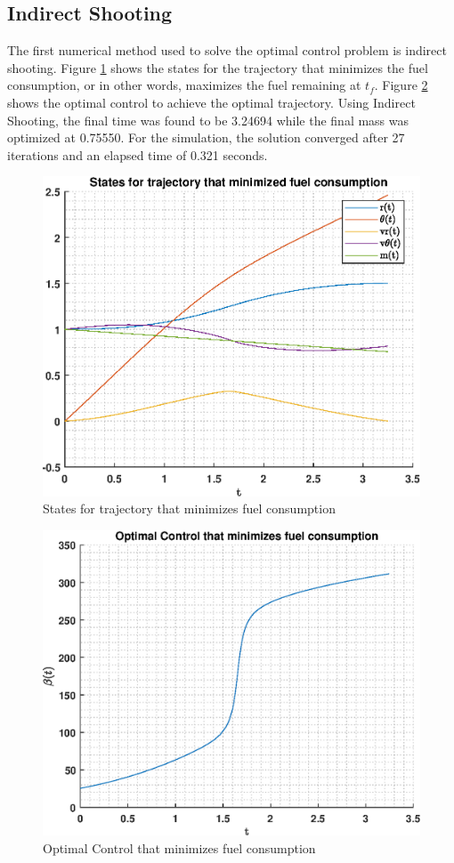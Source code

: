 \documentclass[]{article}
\begin{document}
\subsection{Indirect Shooting}
The first numerical method used to solve the optimal control problem is indirect shooting. Figure \ref{fig:indirectStates} shows the states for the trajectory that minimizes the fuel consumption, or in other words, maximizes the fuel remaining at \(t_f\). Figure \ref{fig:indirectControl} shows the optimal control to achieve the optimal trajectory. Using Indirect Shooting, the final time was found to be 3.24694 while the final mass was optimized at 0.75550. For the simulation, the solution converged after 27 iterations and an elapsed time of 0.321 seconds.
\begin{figure}[hbt!]
	\centering
	\includegraphics[scale=0.75]{indirectStates.eps}
    \caption{States for trajectory that minimizes fuel consumption}
	\label{fig:indirectStates}
\end{figure}
\begin{figure}
	\centering
	\includegraphics[scale=0.75]{indirectControl.eps}
	\caption{Optimal Control that minimizes fuel consumption}
	\label{fig:indirectControl}
\end{figure}
\end{document}
